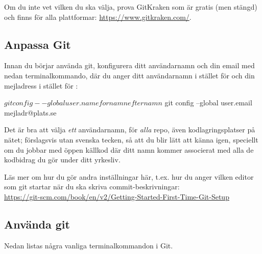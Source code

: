 Om du inte vet vilken du ska välja, prova GitKraken som är gratis (men stängd) och finns för alla plattformar: \url{https://www.gitkraken.com/}.


\subsection{Anpassa Git}

Innan du börjar använda git, konfigurera ditt användarnamn och din email med nedan terminalkommando, där du anger ditt användarnamn i stället för  och din mejladress i stället för :
\begin{REPLnonum}
$ git config --global user.name fornamnefternamn
$ git config --global user.email mejladr@plats.se
\end{REPLnonum}
Det är bra att välja \textit{ett} användarnamn, för \textit{alla} repo, även kodlagringsplatser på nätet; förslagsvis  utan svenska tecken,  så att du blir lätt att känna igen, speciellt om du jobbar med öppen källkod där ditt namn kommer associerat med alla de kodbidrag du gör under ditt yrkesliv.

Läs mer om hur du gör andra inställningar här, t.ex. hur du anger vilken editor som git startar när du ska skriva commit-beskrivningar: \\ \url{https://git-scm.com/book/en/v2/Getting-Started-First-Time-Git-Setup}
  
  
\subsection{Använda git}

Nedan listas några vanliga terminalkommandon i Git.

